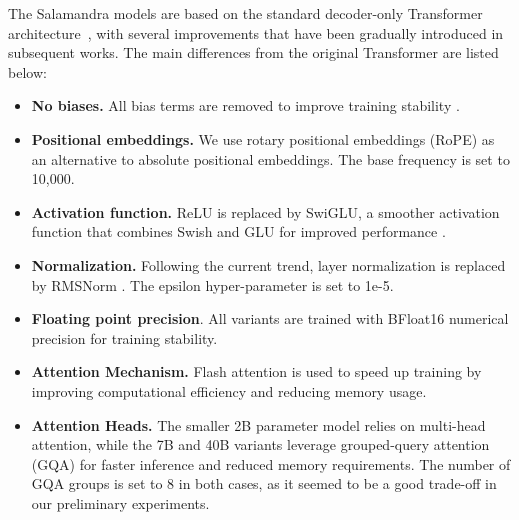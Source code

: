 
The Salamandra models are based on the standard decoder-only Transformer \mbox{architecture \cite{attention}}, with several improvements that have been gradually introduced in \mbox{subsequent} works. The main differences from the original Transformer are listed below:

\begin{itemize}
    \item \textbf{No biases.} All bias terms are removed to improve training stability \cite{palm}. 
    \item \textbf{Positional embeddings.} We use rotary positional embeddings (RoPE) \cite{rope} as an alternative to absolute positional embeddings. The base frequency is set to 10,000. 
    \item \textbf{Activation function.} ReLU is replaced by SwiGLU, a smoother activation function that combines Swish \cite{swish} and GLU \cite{glu} for improved performance \cite{swiglu}.
    \item \textbf{Normalization.} Following the current trend, layer normalization \cite{layer-norm} is replaced by \mbox{RMSNorm} \cite{rms-norm}. The epsilon hyper-parameter is set to 1e-5.
    \item \textbf{Floating point precision}. All variants are trained with BFloat16 numerical precision for training stability.
    \item \textbf{Attention Mechanism.} Flash attention \cite{flash} is used to speed up training by improving computational efficiency and reducing memory usage.
    \item \textbf{Attention Heads.} The smaller 2B parameter model relies on multi-head attention, while the 7B and 40B variants leverage grouped-query attention (GQA) \cite{gqa} for faster inference and reduced memory requirements. The number of GQA groups is set to 8 in both cases, as it seemed to be a good trade-off in our preliminary experiments.
\end{itemize}
